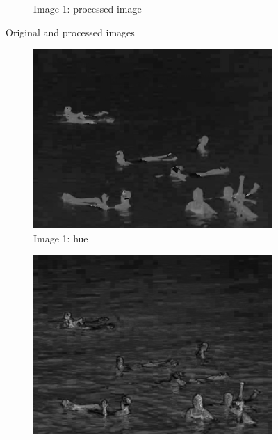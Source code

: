 \begin{figure}
\begin{subfigure}[h]{0.3\textwidth}
                \caption{Image 1: processed image}
                \label{fig:final}
        \end{subfigure}
        \caption{Original and processed images}
\end{figure}

\begin{figure}
        \centering
        \begin{subfigure}[b]{0.3\textwidth}
                \includegraphics[width=\textwidth]{Images/hue}
                \caption{Image 1: hue}
                \label{fig:original}
        \end{subfigure}%
        \quad
        \begin{subfigure}[b]{0.3\textwidth}
                \includegraphics[width=\textwidth]{Images/sat}

\end{subfigure}
\end{figure}
